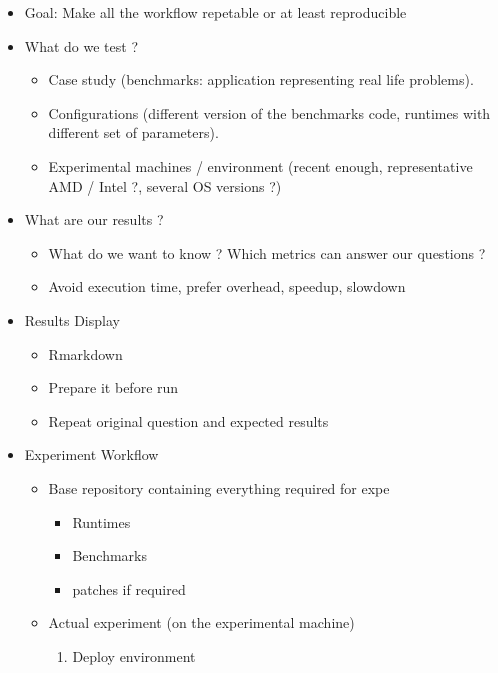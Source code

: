 \begin{itemize}
    \item Goal: Make all the workflow repetable or at least reproducible
    \item What do we test ?
        \begin{itemize}
            \item Case study (benchmarks: application representing real life
                problems).
            \item Configurations (different version of the benchmarks code,
                runtimes with different set of parameters).
            \item Experimental machines / environment (recent enough,
                representative AMD / Intel ?, several OS versions ?)
        \end{itemize}
    \item What are our results ?
        \begin{itemize}
            \item What do we want to know ? Which metrics can answer our
                questions ?
            \item Avoid execution time, prefer overhead, speedup, slowdown
        \end{itemize}
    \item Results Display
        \begin{itemize}
            \item Rmarkdown
            \item Prepare it before run
            \item Repeat original question and expected results
        \end{itemize}
    \item Experiment Workflow
        \begin{itemize}
            \item Base repository containing everything required for expe
                \begin{itemize}
                        \item Runtimes
                        \item Benchmarks
                        \item patches if required
                \end{itemize}
            \item  Actual experiment (on the experimental machine)
                \begin{enumerate}
                    \item Deploy environment

\end{enumerate}
\end{itemize}
\end{itemize}
